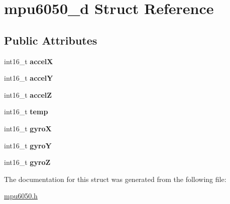 \hypertarget{structmpu6050__d}{}\section{mpu6050\+\_\+d Struct Reference}
\label{structmpu6050__d}
\subsection*{Public Attributes}
\begin{DoxyCompactItemize}
\item 
\mbox{\label{structmpu6050__d_adb7ccae71a0c5e7f258586d0495c6a8c}} 
int16\+\_\+t {\bfseries accelX}
\item 
\mbox{\label{structmpu6050__d_aaa5222f3976416bcae0e75a9ba65f0fe}} 
int16\+\_\+t {\bfseries accelY}
\item 
\mbox{\label{structmpu6050__d_a0fdcaed0c39c82e43beb78ccb49c47f2}} 
int16\+\_\+t {\bfseries accelZ}
\item 
\mbox{\label{structmpu6050__d_ad9660eb6bd1f5d93fd06b8d8f8edbfeb}} 
int16\+\_\+t {\bfseries temp}
\item 
\mbox{\label{structmpu6050__d_a2c4aa4ef6faddb414f6a638a45d5f634}} 
int16\+\_\+t {\bfseries gyroX}
\item 
\mbox{\label{structmpu6050__d_aae7232a3273a9b40ab0b97a18cb42451}} 
int16\+\_\+t {\bfseries gyroY}
\item 
\mbox{\label{structmpu6050__d_a5e65eb26d9829b2fff3eeb96823f0fa1}} 
int16\+\_\+t {\bfseries gyroZ}
\end{DoxyCompactItemize}


The documentation for this struct was generated from the following file\+:\begin{DoxyCompactItemize}
\item 
\hyperlink{mpu6050_8h}{mpu6050.\+h}\end{DoxyCompactItemize}
